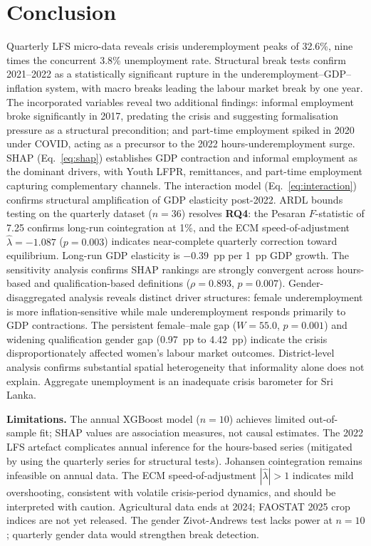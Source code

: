 \documentclass[sigconf]{acmart}
\begin{document}
\section{Conclusion}

Quarterly LFS micro-data reveals crisis underemployment peaks of 32.6\%,
nine times the concurrent 3.8\% unemployment rate. Structural break tests
confirm 2021--2022 as a statistically significant rupture in the
underemployment--GDP--inflation system, with macro breaks leading the labour
market break by one year. The incorporated variables reveal two additional
findings: informal employment broke significantly in 2017, predating the
crisis and suggesting formalisation pressure as a structural precondition;
and part-time employment spiked in 2020 under COVID, acting as a precursor
to the 2022 hours-underemployment surge. SHAP (Eq.~\ref{eq:shap})
establishes GDP contraction and informal employment as the dominant drivers,
with Youth LFPR, remittances, and part-time employment capturing
complementary channels. The interaction model (Eq.~\ref{eq:interaction})
confirms structural amplification of GDP elasticity post-2022. ARDL bounds
testing on the quarterly dataset ($n{=}36$) resolves \textbf{RQ4}: the
Pesaran $F$-statistic of 7.25 confirms long-run cointegration at 1\%,
and the ECM speed-of-adjustment $\hat\lambda{=}{-}1.087$ ($p{=}0.003$)
indicates near-complete quarterly correction toward equilibrium. Long-run
GDP elasticity is $-0.39$~pp per 1~pp GDP growth. The sensitivity analysis
confirms SHAP rankings are strongly convergent across
hours-based and qualification-based definitions ($\rho = 0.893$,
$p = 0.007$). Gender-disaggregated analysis reveals distinct driver
structures: female underemployment is more inflation-sensitive while male
underemployment responds primarily to GDP contractions. The persistent
female--male gap ($W = 55.0$, $p = 0.001$) and widening qualification
gender gap (0.97~pp to 4.42~pp) indicate the crisis disproportionately
affected women's labour market outcomes. District-level analysis confirms
substantial spatial heterogeneity that informality alone does not explain.
Aggregate unemployment is an inadequate crisis barometer for Sri Lanka.

\textbf{Limitations.} The annual XGBoost model ($n{=}10$) achieves limited
out-of-sample fit; SHAP values are association measures, not causal
estimates. The 2022 LFS artefact complicates annual inference for the
hours-based series (mitigated by using the quarterly series for structural
tests). Johansen cointegration remains infeasible on annual data. The ECM
speed-of-adjustment $|\hat\lambda|{>}1$ indicates mild overshooting,
consistent with volatile crisis-period dynamics, and should be interpreted
with caution. Agricultural data ends at 2024; FAOSTAT 2025 crop indices
are not yet released. The gender Zivot-Andrews test lacks power at $n{=}10$;
quarterly gender data would strengthen break detection.
\end{document}

